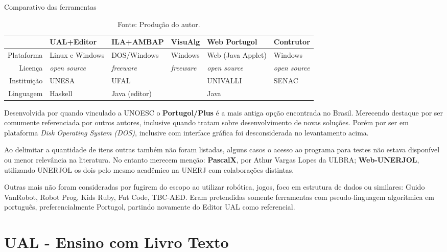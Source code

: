 \begin{table}[h]
\centering
  \caption{Comparativo das ferramentas}\label{qua:compare-tools}
\begin{tabular}{ r | l | l | l | l | l }\hline
& UAL+Editor & ILA+AMBAP & VisuAlg & Web Portugol & Contrutor \\ \hline
Plataforma & Linux e Windows & DOS/Windows & Windows & Web (Java Applet) & Windows \\ \hline
Licença & \textit{open source} & \textit{freeware} & \textit{freeware} & \textit{open source} & \textit{open source} \\ \hline
Instituição & UNESA & UFAL &  & UNIVALLI & SENAC \\ \hline
Linguagem & Haskell & Java (editor) &  & Java & \\ \hline
\end{tabular}
  \caption*{\ifdraft{\color{green}}{}\footnotesize Fonte: Produção do autor.}
\end{table}

Desenvolvida por  quando vinculado a UNOESC o \textbf{Portugol/Plus} é a mais antiga opção encontrada no Brasil. Merecendo destaque por ser comumente referenciada por outros autores, inclusive quando tratam sobre desenvolvimento de novas soluções. Porém por ser em plataforma \textit{Disk Operating System (DOS)}, inclusive com interface gráfica foi desconsiderada no levantamento acima.

Ao delimitar a quantidade de itens outras também não foram listadas, alguns casos o acesso ao programa para testes não estava disponível ou menor relevância na literatura. No entanto  merecem menção: \textbf{PascalX}, por Athur Vargas Lopes da ULBRA; \textbf{Web-UNERJOL}\nocite{ferrandin2015}, utilizando UNERJOL os dois pelo mesmo acadêmico na UNERJ com colaborações distintas.

Outras mais não foram consideradas por fugirem do escopo ao utilizar robótica, jogos, foco em estrutura de dados ou similares: Guido VanRobot, Robot Prog, Kids Ruby, Fut Code, TBC-AED. Eram pretendidas somente ferramentas com pseudo-linguagem algorítmica em português, preferencialmente Portugol, partindo novamente do Editor UAL como referencial.

\section{UAL - Ensino com Livro Texto}


